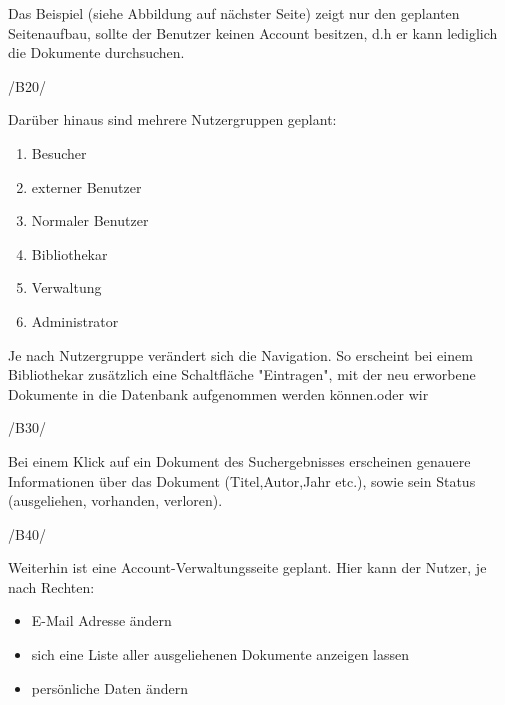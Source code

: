 Das Beispiel (siehe Abbildung auf nächster Seite) zeigt nur den geplanten Seitenaufbau, sollte der Benutzer keinen
Account besitzen, d.h er kann lediglich die Dokumente durchsuchen.

/B20/

Darüber hinaus sind mehrere Nutzergruppen geplant:

\begin{enumerate}
\item Besucher
\item externer Benutzer
\item Normaler Benutzer
\item Bibliothekar
\item Verwaltung
\item Administrator
\end{enumerate}

Je nach Nutzergruppe verändert sich die Navigation. So erscheint bei einem Bibliothekar zusätzlich eine 
Schaltfläche "Eintragen", mit der neu erworbene Dokumente in die Datenbank aufgenommen werden können.oder wir


/B30/

Bei einem Klick auf ein Dokument des Suchergebnisses erscheinen genauere Informationen über das Dokument (Titel,Autor,Jahr etc.), sowie
sein Status (ausgeliehen, vorhanden, verloren).

/B40/

Weiterhin ist eine Account-Verwaltungsseite geplant.
\newline
\newline
Hier kann der Nutzer, je nach Rechten:

\begin{itemize}
\item E-Mail Adresse ändern
\item sich eine Liste aller ausgeliehenen Dokumente anzeigen lassen
\item persönliche Daten ändern
\end{itemize}





 